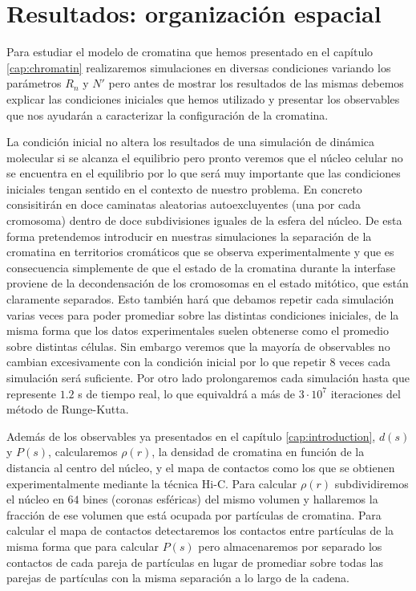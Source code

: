 \chapter{Resultados: organización espacial}
\label{cap:results}

Para estudiar el modelo de cromatina que hemos presentado en el capítulo \ref{cap:chromatin} realizaremos simulaciones en diversas condiciones variando los parámetros $R_n$ y $N'$ pero antes de mostrar los resultados de las mismas debemos explicar las condiciones iniciales que hemos utilizado y presentar los observables que nos ayudarán a caracterizar la configuración de la cromatina.

La condición inicial no altera los resultados de una simulación de dinámica molecular si se alcanza el equilibrio pero pronto veremos que el núcleo celular no se encuentra en el equilibrio por lo que será muy importante que las condiciones iniciales tengan sentido en el contexto de nuestro problema. En concreto consisitirán en doce caminatas aleatorias autoexcluyentes (una por cada cromosoma) dentro de doce subdivisiones iguales de la esfera del núcleo. De esta forma pretendemos introducir en nuestras simulaciones la separación de la cromatina en territorios cromáticos que se observa experimentalmente y que es consecuencia simplemente de que el estado de la cromatina durante la interfase proviene de la decondensación de los cromosomas en el estado mitótico, que están claramente separados. Esto también hará que debamos repetir cada simulación varias veces para poder promediar sobre las distintas condiciones iniciales, de la misma forma que los datos experimentales suelen obtenerse como el promedio sobre distintas células. Sin embargo veremos que la mayoría de observables no cambian excesivamente con la condición inicial por lo que repetir $8$ veces cada simulación será suficiente. Por otro lado prolongaremos cada simulación hasta que represente $1.2$ s de tiempo real, lo que equivaldrá a más de $3\cdot10^7$ iteraciones del método de Runge-Kutta.

Además de los observables ya presentados en el capítulo \ref{cap:introduction}, $d(s)$ y $P(s)$, calcularemos $\rho(r)$, la densidad de cromatina en función de la distancia al centro del núcleo, y el mapa de contactos como los que se obtienen experimentalmente mediante la técnica Hi-C. Para calcular $\rho(r)$ subdividiremos el núcleo en $64$ bines (coronas esféricas) del mismo volumen y hallaremos la fracción de ese volumen que está ocupada por partículas de cromatina. Para calcular el mapa de contactos detectaremos los contactos entre partículas de la misma forma que para calcular $P(s)$ pero almacenaremos por separado los contactos de cada pareja de partículas en lugar de promediar sobre todas las parejas de partículas con la misma separación a lo largo de la cadena.

